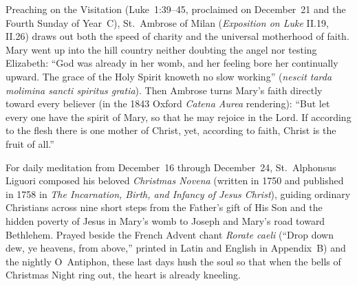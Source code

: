 Preaching on the Visitation (Luke~1:39--45, proclaimed on December~21 and the Fourth Sunday of Year~C), St.~Ambrose of Milan (\textit{Exposition on Luke} II.19, II.26) draws out both the speed of charity and the universal motherhood of faith. Mary went up into the hill country neither doubting the angel nor testing Elizabeth: ``God was already in her womb, and her feeling bore her continually upward. The grace of the Holy Spirit knoweth no slow working'' (\textit{nescit tarda molimina sancti spiritus gratia}). Then Ambrose turns Mary's faith directly toward every believer (in the 1843 Oxford \textit{Catena Aurea} rendering): ``But let every one have the spirit of Mary, so that he may rejoice in the Lord. If according to the flesh there is one mother of Christ, yet, according to faith, Christ is the fruit of all.''

For daily meditation from December~16 through December~24, St.~Alphonsus Liguori composed his beloved \textit{Christmas Novena} (written in 1750 and published in 1758 in \textit{The Incarnation, Birth, and Infancy of Jesus Christ}), guiding ordinary Christians across nine short steps from the Father's gift of His Son and the hidden poverty of Jesus in Mary's womb to Joseph and Mary's road toward Bethlehem. Prayed beside the French Advent chant \textit{Rorate caeli} (``Drop down dew, ye heavens, from above,'' printed in Latin and English in Appendix~B) and the nightly O~Antiphon, these last days hush the soul so that when the bells of Christmas Night ring out, the heart is already kneeling.
